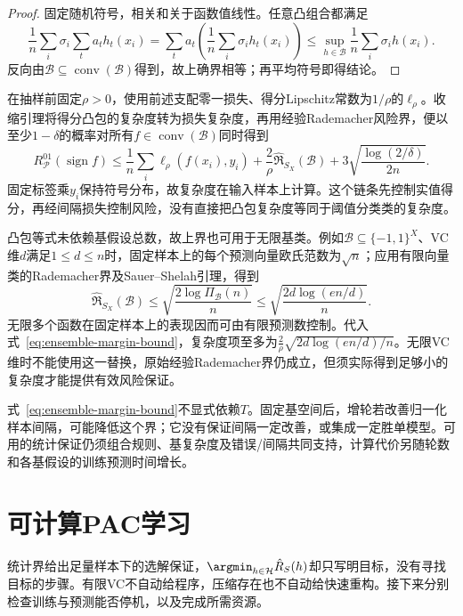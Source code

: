 \begin{proof}
固定随机符号，相关和关于函数值线性。任意凸组合都满足
\[
 \frac1n\sum_i\sigma_i\sum_ta_th_t(x_i)
 =\sum_ta_t\left(\frac1n\sum_i\sigma_ih_t(x_i)\right)
 \leq\sup_{h\in\mathcal B}\frac1n\sum_i\sigma_ih(x_i).
\]
反向由$\mathcal B\subseteq\operatorname{conv}(\mathcal B)$得到，故上确界相等；再平均符号即得结论。
\end{proof}

在抽样前固定$\rho>0$，使用前述支配零一损失、得分Lipschitz常数为$1/\rho$的$\ell_\rho$。收缩引理将得分凸包的复杂度转为损失复杂度，再用经验Rademacher风险界，便以至少$1-\delta$的概率对所有$f\in\operatorname{conv}(\mathcal B)$同时得到
\begin{equation}
 R_{\mathcal P}^{01}(\operatorname{sign}f)
 \leq\frac1n\sum_i\ell_\rho(f(x_i),y_i)
 +\frac{2}{\rho}\widehat{\mathfrak R}_{S_X}(\mathcal B)
 +3\sqrt{\frac{\log(2/\delta)}{2n}}.
 \label{eq:ensemble-margin-bound}
\end{equation}
固定标签乘$y_i$保持符号分布，故复杂度在输入样本上计算。这个链条先控制实值得分，再经间隔损失控制风险，没有直接把凸包复杂度等同于阈值分类类的复杂度。

凸包等式未依赖基假设总数，故上界也可用于无限基类。例如$\mathcal B\subseteq\{-1,1\}^X$、VC维$d$满足$1\leq d\leq n$时，固定样本上的每个预测向量欧氏范数为$\sqrt n$；应用有限向量类的Rademacher界及Sauer--Shelah引理，得到
\[
 \widehat{\mathfrak R}_{S_X}(\mathcal B)
 \leq\sqrt{\frac{2\log\Pi_{\mathcal B}(n)}{n}}
 \leq\sqrt{\frac{2d\log(en/d)}{n}}.
\]
无限多个函数在固定样本上的表现因而可由有限预测数控制。代入式~\eqref{eq:ensemble-margin-bound}，复杂度项至多为$\frac{2}{\rho}\sqrt{2d\log(en/d)/n}$。无限VC维时不能使用这一替换，原始经验Rademacher界仍成立，但须实际得到足够小的复杂度才能提供有效风险保证。

式~\eqref{eq:ensemble-margin-bound}不显式依赖$T$。固定基空间后，增轮若改善归一化样本间隔，可能降低这个界；它没有保证间隔一定改善，或集成一定胜单模型。可用的统计保证仍须组合规则、基复杂度及错误/间隔共同支持，计算代价另随轮数和各基假设的训练预测时间增长。

\section{可计算PAC学习}
\label{sec:computable-binary-learning}

统计界给出足量样本下的选解保证，$\argmin_{h\in\mathcal H}\hat R_S(h)$却只写明目标，没有寻找目标的步骤。有限VC不自动给程序，压缩存在也不自动给快速重构。接下来分别检查训练与预测能否停机，以及完成所需资源。

